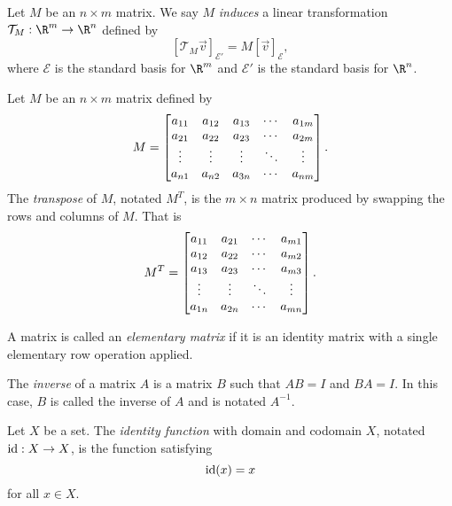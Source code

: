\begin{SaveDefinition}[
	key=InducedTransformation,
	title={Induced Transformation}]

	Let $M$ be an $n\times m$ matrix. We say $M$
	\emph{induces} a linear transformation $\mathcal T_{M}:\R^{m}\to\R^{n}$ defined
	by
	\[
		[\mathcal T_{M}\vec v]_{\mathcal E'}= M[\vec v]_{\mathcal E},
	\]
	 where $\mathcal E$ is the standard basis for $\R^{m}$ and $\mathcal E'$
	is the standard basis for $\R^{n}$.
\end{SaveDefinition}

\begin{SaveDefinition}[
	key=Transpose,
	title={Transpose}]

	Let $M$ be an $n\times m$ matrix defined by
	\[
		M=\begin{bmatrix}
			a_{11}&a_{12}&a_{13}&\cdots & a_{1m}\\
		a_{21}&a_{22}&a_{23}&\cdots&a_{2m}\\
		\vdots &\vdots&\vdots &\ddots&\vdots\\
		a_{n1}&a_{n2}&a_{3n}&\cdots&a_{nm}\end{bmatrix}.
	\]
	The \emph{transpose} of $M$, notated $M^T$, is the $m\times n$ matrix produced by swapping the rows
	and columns of $M$. That is
	\[
		M^T=\begin{bmatrix}
		a_{11}&a_{21}&\cdots&a_{m1}\\
		a_{12}&a_{22}&\cdots&a_{m2}\\
		a_{13}&a_{23}&\cdots&a_{m3}\\
		\vdots&\vdots&\ddots&\vdots\\
		a_{1n}&a_{2n}&\cdots&a_{mn}\end{bmatrix}.
	\]
\end{SaveDefinition}

\begin{SaveDefinition}[
	key=ElementaryMatrix,
	title={Elementary Matrix}]

	A matrix is called an \emph{elementary matrix} if it is an identity matrix with a single elementary row operation applied.
\end{SaveDefinition}

\begin{SaveDefinition}[
	key=MatrixInverse,
	title={Matrix Inverse}]
		
	The \emph{inverse} of a matrix $A$ is a
		matrix $B$ such that $AB=I$ and $BA=I$.
		In this case, $B$ is called the inverse of $A$ and is notated $A^{-1}$.
\end{SaveDefinition}

\begin{SaveDefinition}[
	key=IdentityFunction,
	title={Identity Function}]
	
	Let $X$ be a set. The \emph{identity function} with domain and codomain $X$,
	notated $\operatorname{\operatorname{id}}:X\to X$, is the function satisfying
	\[
		\operatorname{\operatorname{id}}(x)=x
	\]
	for all $x\in X$.
\end{SaveDefinition}

